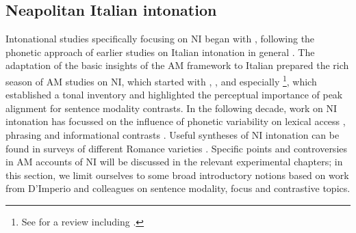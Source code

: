 \subsection{Neapolitan Italian intonation}\label{sec123}
Intonational studies specifically focusing on NI began with \citet{maturi1988intonazione}, following the phonetic approach of earlier studies on Italian intonation in general \citep{magnocaldognetto1978f0}. The adaptation of the basic insights of the AM framework to Italian \citep{avesani1990contribution} prepared the rich season of AM studies on NI, which started with \citet{caputo1994intonazione,caputo1996presupposizione}, \citet{caputo1995possibile}, and especially \citet{dimperio1995timing,dimperio1997narrow,dimperio2001focus,dimperio2003tonal}\footnote{See \citet[§2.1]{dimperio2000role} for a review including \citet{dimperio1996caratteristiche,dimperio1997breadth,dimperio1997perception}.}, which established a tonal inventory and highlighted the perceptual importance of peak alignment for sentence modality contrasts. In the following decade, work on NI intonation has focussed on the influence of phonetic variability on lexical access \citep{dimperio2007effects}, phrasing \citep{petrone2008tonal,petrone2011tones,dimperio2011phrasing} and informational contrasts \citep{brunetti2010prosodic}. Useful syntheses of NI intonation can be found in surveys of different Romance varieties \citep{dimperio2002italian,grice2005strategy,prieto2005pitch}. Specific points and controversies in AM accounts of NI will be discussed in the relevant experimental chapters; in this section, we limit ourselves to some broad introductory notions based on work from D'Imperio and colleagues \citep{grice2005strategy,petrone2011tones,dimperio2011phrasing} on sentence modality, focus and contrastive topics.

